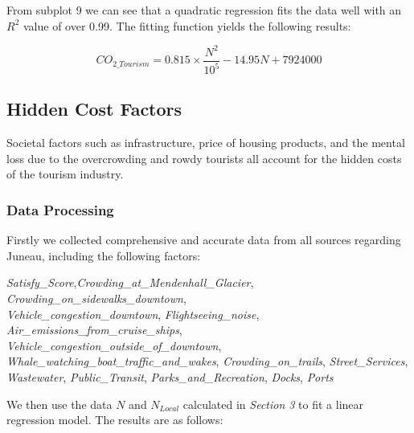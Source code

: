 \begin{figure}[H]
\begin{minipage}{0.33\textwidth}
    \end{minipage}
\end{figure}

From subplot 9 we can see that a quadratic regression 
fits the data well with an $R^2$ value of over 0.99.
The fitting function yields the following results:

\begin{equation}
    CO_{2\_Tourism} = 0.815 \times \frac{N^2}{10^5} - 14.95N+7924000
\end{equation}



\subsection{Hidden Cost Factors}

Societal factors such as infrastructure, price of housing products, and the mental
loss due to the overcrowding and rowdy tourists all account for the hidden costs of the tourism industry.

\subsubsection{Data Processing}

Firstly we collected comprehensive and accurate data from all sources regarding Juneau, including the following factors:

\textit{Satisfy\_Score},\textit{Crowding\_at\_Mendenhall\_Glacier}, \textit{Crowding\_on\_sidewalks\_downtown}, \\ \textit{Vehicle\_congestion\_downtown}, \textit{Flightseeing\_noise}, \textit{Air\_emissions\_from\_cruise\_ships},\\ \textit{Vehicle\_congestion\_outside\_of\_downtown}, 
\textit{Whale\_watching\_boat\_traffic\_and\_wakes}, \textit{Crowding\_on\_trails}, \textit{Street\_Services}, \textit{Wastewater}, \textit{Public\_Transit}, \textit{Parks\_and\_Recreation}, 
\textit{Docks}, \textit{Ports}

We then use the data $N$ and $N_{Local}$ calculated in \textit{Section 3} to fit a linear regression model. The results are as follows:

